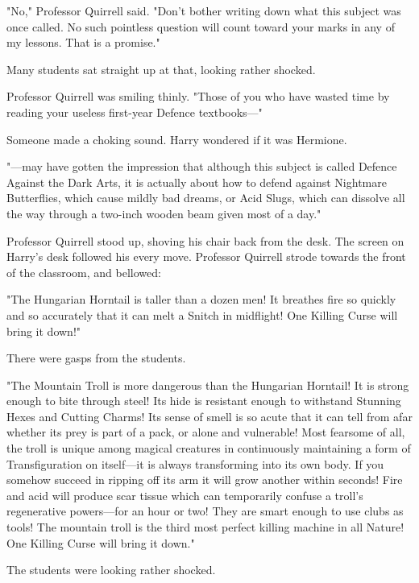 "No," Professor Quirrell said. "Don't bother writing down what this subject was
once called. No such pointless question will count toward your marks in any of
my lessons. That is a promise."

Many students sat straight up at that, looking rather shocked.

Professor Quirrell was smiling thinly. "Those of you who have wasted time by
reading your useless first-year Defence textbooks—"

Someone made a choking sound. Harry wondered if it was Hermione.

"—may have gotten the impression that although this subject is called Defence
Against the Dark Arts, it is actually about how to defend against Nightmare
Butterflies, which cause mildly bad dreams, or Acid Slugs, which can dissolve
all the way through a two-inch wooden beam given most of a day."

Professor Quirrell stood up, shoving his chair back from the desk. The screen
on Harry's desk followed his every move. Professor Quirrell strode towards the
front of the classroom, and bellowed:

"The Hungarian Horntail is taller than a dozen men! It breathes fire so quickly
and so accurately that it can melt a Snitch in midflight! One Killing Curse
will bring it down!"

There were gasps from the students.

"The Mountain Troll is more dangerous than the Hungarian Horntail! It is strong
enough to bite through steel! Its hide is resistant enough to withstand
Stunning Hexes and Cutting Charms! Its sense of smell is so acute that it can
tell from afar whether its prey is part of a pack, or alone and vulnerable!
Most fearsome of all, the troll is unique among magical creatures in
continuously maintaining a form of Transfiguration on itself—it is always
transforming into its own body. If you somehow succeed in ripping off its arm
it will grow another within seconds! Fire and acid will produce scar tissue
which can temporarily confuse a troll's regenerative powers—for an hour or
two! They are smart enough to use clubs as tools! The mountain troll is the
third most perfect killing machine in all Nature! One Killing Curse will bring
it down."

The students were looking rather shocked.

